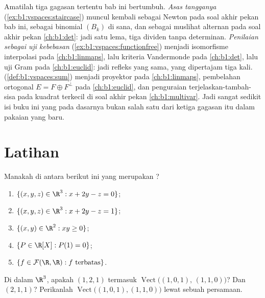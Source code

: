 \begin{remark}
\label{rem:b1:vspaces:threads}
Amatilah tiga gagasan tertentu bab ini bertumbuh.
\emph{Asas tangganya}
(\cref{ex:b1:vspaces:staircase}) muncul kembali sebagai  Newton
pada soal akhir pekan bab ini, sebagai  binomial
$(B_k)$ di sana, dan sebagai muslihat alternan  pada
soal akhir pekan \cref{ch:b1:det}: jadi satu lema, tiga
dividen tanpa determinan.
\emph{Penilaian sebagai uji kebebasan}
(\cref{ex:b1:vspaces:functionfree}) menjadi isomorfisme interpolasi
pada \cref{ch:b1:linmaps}, lalu kriteria Vandermonde
pada \cref{ch:b1:det}, lalu uji Gram pada
\cref{ch:b1:euclid}: jadi refleks yang sama, yang dipertajam tiga kali.
\emph{} (\cref{def:b1:vspaces:sum}) menjadi
proyektor pada \cref{ch:b1:linmaps}, pembelahan ortogonal $E =
F \oplus F^\perp$ pada \cref{ch:b1:euclid}, dan penguraian
terjelaskan-tambah-sisa pada kuadrat terkecil di
soal akhir pekan \cref{ch:b1:multivar}. Jadi sangat sedikit isi buku
ini yang pada dasarnya bukan salah satu dari ketiga gagasan itu dalam pakaian
yang baru.
\end{remark}

\section{Latihan}

\begin{exercise}[$\star$]\label{exo:b1:vspaces:1}
Manakah di antara berikut ini yang merupakan ?
\begin{enumerate}
  \item $\{(x, y, z) \in \R^3 : x + 2y - z = 0\}$;
  \item $\{(x, y, z) \in \R^3 : x + 2y - z = 1\}$;
  \item $\{(x, y) \in \R^2 : xy \geq 0\}$;
  \item $\{P \in \R[X] : P(1) = 0\}$;
  \item $\{f \in \mathcal{F}(\R,\R) : f \text{ terbatas}\}$.
\end{enumerate}
\end{exercise}

\begin{exercise}[$\star$]\label{exo:b1:vspaces:2}
Di dalam $\R^3$, apakah $(1, 2, 1)$ termasuk
$\operatorname{Vect}\bigl((1,0,1),\, (1,1,0)\bigr)$? Dan $(2, 1,
1)$? Perikanlah $\operatorname{Vect}\bigl((1,0,1),(1,1,0)\bigr)$ lewat sebuah
persamaan.
\end{exercise}

